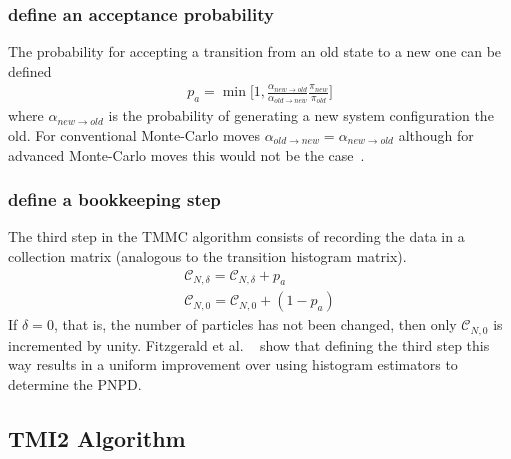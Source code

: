 \documentclass[letterpaper,twocolumn,amsmath,amssymb,pre,aps,10pt]{revtex4-1}
\begin{document}
\subsubsection{define an acceptance probability}
The probability for accepting a transition from an old state to a new one can be 
defined
\begin{align}
  p_{a} = \min\bigg[1,\frac{\alpha_{new\rightarrow old}}
  {\alpha_{old \rightarrow new}}\frac{\pi_{new}}{\pi_{old}}\bigg]
\end{align}
where $\alpha_{new\rightarrow old}$ is the probability of generating a new system 
configuration the old.  For conventional Monte-Carlo moves $\alpha_{old \rightarrow new}
=\alpha_{new\rightarrow old}$ although for advanced Monte-Carlo moves this would not 
be the case~\cite{paluch2008comparing, siepmann1990method}.

\subsubsection{define a bookkeeping step}
The third step in the TMMC algorithm consists of recording the data in a collection 
matrix (analogous to the transition histogram matrix).
\begin{align}
  \mathcal{C}_{N,\delta} = \mathcal{C}_{N,\delta} + p_{a}\\
  \mathcal{C}_{N,0} = \mathcal{C}_{N,0} +(1 - p_{a})
\end{align}  
If $\delta=0$, that is, the number of particles has not been changed, then only 
$\mathcal{C}_{N,0}$ is incremented by unity. Fitzgerald et al. ~\cite{fitzgerald2000monte}
show that defining the third step this way results in a uniform improvement over 
using histogram estimators to determine the PNPD.

\subsection{TMI2 Algorithm}
\end{document}
